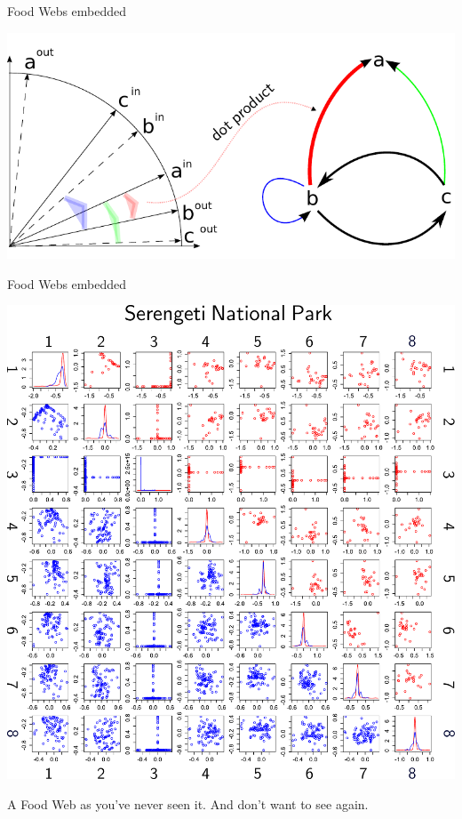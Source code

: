 \documentclass[]{beamer}
\begin{document}
\begin{frame}{Food Webs embedded}


\centering
\includegraphics[width=0.9\linewidth]{images/RDPGmodel.pdf}

\end{frame}

\begin{frame}{Food Webs embedded}

\centering
  \includegraphics[width=0.6\linewidth]{images/Serengeti_scatter_8.pdf}

\centering
{\tiny A Food Web as you've never seen it. And don't want to see again.}
 
\end{frame}
\end{document}
